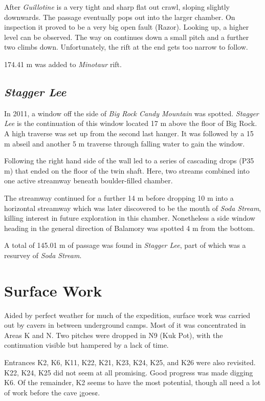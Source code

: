 After \emph{Guillotine} is a very tight and sharp flat out crawl,
sloping slightly downwards. The passage eventually pops out into the
larger chamber. On inspection it proved to be a very big open fault
(Razor). Looking up, a higher level can be observed. The way on
continues down a small pitch and a further two climbs down.
Unfortunately, the rift at the end gets too narrow to follow.

174.41 m was added to \emph{Minotaur} rift.

\hypertarget{stagger-lee}{%
\subsection{\texorpdfstring{\emph{Stagger
Lee}}{Stagger Lee}}\label{stagger-lee}}

In 2011, a window off the side of \emph{Big Rock Candy Mountain} was
spotted. \emph{Stagger Lee} is the continuation of this window located
17 m above the floor of Big Rock. A high traverse was set up from the
second last hanger. It was followed by a 15 m abseil and another 5 m
traverse through falling water to gain the window.

Following the right hand side of the wall led to a series of cascading
drops (P35 m) that ended on the floor of the twin shaft. Here, two
streams combined into one active streamway beneath boulder-filled
chamber.

The streamway continued for a further 14 m before dropping 10 m into a
horizontal streamway which was later discovered to be the mouth of
\emph{Soda Stream}, killing interest in future exploration in this
chamber. Nonetheless a side window heading in the general direction of
Balamory was spotted 4 m from the bottom.

A total of 145.01 m of passage was found in \emph{Stagger Lee}, part of
which was a resurvey of \emph{Soda Stream}.

\hypertarget{surface-work}{%
\section{Surface Work}\label{surface-work}}

Aided by perfect weather for much of the expedition, surface work was
carried out by cavers in between underground camps. Most of it was
concentrated in Areas K and N. Two pitches were dropped in N9 (Kuk Pot),
with the continuation visible but hampered by a lack of time.

Entrances K2, K6, K11, K22, K21, K23, K24, K25, and K26 were also
revisited. K22, K24, K25 did not seem at all promising. Good progress
was made digging K6. Of the remainder, K2 seems to have the most
potential, though all need a lot of work before the cave ¡goes¢.

